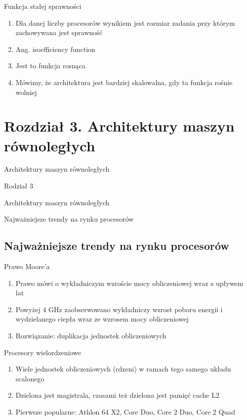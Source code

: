 \documentclass{beamer}
\begin{document}
\begin{frame}{Funkcja stałej sprawności}
  \begin{enumerate}
  \item Dla danej liczby procesorów wynikiem jest rozmiar zadania przy którym zachowywana jest sprawność
  \item Ang. isoefficiency function
  \item Jest to funkcja rosnąca
  \item Mówimy, że architektura jest bardziej skalowalna, gdy ta funkcja rośnie wolniej
  \end{enumerate}
\end{frame}

\section{Rozdział 3. Architektury maszyn równoległych}

\begin{frame}{Architektury maszyn równoległych}
  \huge
  \begin{center}
    Rodział 3

    Architektury maszyn równoległych

    \large

    Najważniejsze trendy na rynku procesorów
  \end{center}
\end{frame}

\subsection{Najważniejsze trendy na rynku procesorów}

\begin{frame}{Prawo Moore'a}
  \begin{enumerate}
  \item Prawo mówi o wykładniczym wzroście mocy obliczeniowej wraz z upływem lat
  \item Powyżej 4 GHz zaobserwowano wykładniczy wzrost poboru energii i wydzielanego ciepła wraz ze wzrosem mocy obliczeniowej
  \item Rozwiązanie: duplikacja jednostek obliczeniowych
  \end{enumerate}
\end{frame}

\begin{frame}{Procesory wielordzeniowe}
  \begin{enumerate}
  \item Wiele jednostek obliczeniowych (rdzeni) w ramach tego samego układu scalonego
  \item Dzielona jest magistrala, czasami też dzielona jest pamięć cache L2
  \item Pierwsze popularne: Athlon 64 X2, Core Duo, Core 2 Duo, Core 2 Quad
  \end{enumerate}
\end{frame}
\end{document}
